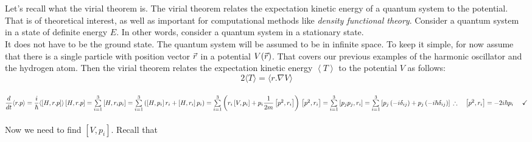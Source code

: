 \documentclass[fleqn]{article}
\begin{document}
\begin{enumerate}
\begin{enumerate}
        \textcolor{hwColor}{
          \\
          \\
          Let's recall what the vir­ial the­o­rem is. The vir­ial the­o­rem re­lates the ex­pec­ta­tion ki­netic en­ergy of a quan­tum sys­tem to the po­ten­tial. 
          That is of the­o­ret­i­cal in­ter­est, as well as im­por­tant for com­pu­ta­tional meth­ods like \emph{den­sity func­tional the­ory}.
          Con­sider a quan­tum sys­tem in a state of def­i­nite en­ergy $E$. In other words, con­sider a quan­tum sys­tem in a sta­tion­ary state. 
          \\
          It does not have to be the ground state. The quan­tum sys­tem will be as­sumed to be in in­fi­nite space. To keep it sim­ple, 
          for now as­sume that there is a sin­gle par­ti­cle with po­si­tion vec­tor ${\skew0\vec r}$ in a po­ten­tial $V({\skew0\vec r})$. 
          That cov­ers our pre­vi­ous ex­am­ples of the har­monic os­cil­la­tor and the hy­dro­gen atom.
          Then the vir­ial the­o­rem re­lates the ex­pec­ta­tion ki­netic en­ergy $\left\langle{T}\right\rangle $ to the po­ten­tial $V$ as fol­lows:
          $$2\langle T \rangle=\langle r.\nabla V\rangle$$
          \\
          $
            \dfrac{d}{dt} \langle r.p \rangle=\dfrac{i}{\hbar} \langle \left[H, r.p\right] \rangle
            \\
            \\
            \left[H, r.p\right]
            =\sum\limits_{i=1}^{3} \left[H, r_i p_i\right]
            =\sum\limits_{i=1}^{3} \left(\left[H, p_i\right]r_i+\left[H, r_i\right]p_i\right)
            =\sum\limits_{i=1}^{3} \left(
              r_i \left[V, p_i\right]+p_i \dfrac{1}{2m} \left[p^2, r_i\right]
            \right)
            \\
            \\
            \\
            \left[p^2, r_i\right]
            =\sum\limits_{i=1}^{3} \left[p_j p_j, r_i\right]
            =\sum\limits_{i=1}^{3} \left[p_j \left(-i \delta_{ij}\right)+p_j \left(-i \hbar \delta_{ij}\right)\right]
            \\
            \\
            \\
            \therefore ~~~ \left[p^2, r_i\right]=-2i \hbar p_i ~~~~ \checkmark
          $
          \\
          \\
          Now we need to find $\left[V, p_i\right]$. Recall that
}
\end{enumerate}
\end{enumerate}
\end{document}
